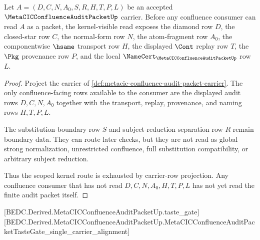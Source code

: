 \begin{theorem}
\label{thm:metacic-confluence-audit-packet-scoped-kernel-route}
Let $A=(D,C,N,A_0,S,R,H,T,P,L)$ be an accepted $\MetaCICConfluenceAuditPacketUp$ carrier. Before any confluence consumer can read $A$ as a packet, the kernel-visible read exposes the diamond row $D$, the closed-star row $C$, the normal-form row $N$, the atom-fragment row $A_0$, the componentwise $\hsame$ transport row $H$, the displayed $\Cont$ replay row $T$, the $\Pkg$ provenance row $P$, and the local $\NameCert_{\MetaCICConfluenceAuditPacketUp}$ row $L$.
\end{theorem}
\begin{proof}
Project the carrier of \autoref{def:metacic-confluence-audit-packet-carrier}. The only confluence-facing rows available to the consumer are the displayed audit rows $D,C,N,A_0$ together with the transport, replay, provenance, and naming rows $H,T,P,L$.

The substitution-boundary row $S$ and subject-reduction separation row $R$ remain boundary data. They can route later checks, but they are not read as global strong normalization, unrestricted confluence, full substitution compatibility, or arbitrary subject reduction.

Thus the scoped kernel route is exhausted by carrier-row projection. Any confluence consumer that has not read $D,C,N,A_0,H,T,P,L$ has not yet read the finite audit packet itself.
\end{proof}



[BEDC.Derived.MetaCICConfluenceAuditPacketUp.taste\_gate]
[BEDC.Derived.MetaCICConfluenceAuditPacketUp.MetaCICConfluenceAuditPacketTasteGate\_single\_carrier\_alignment]

